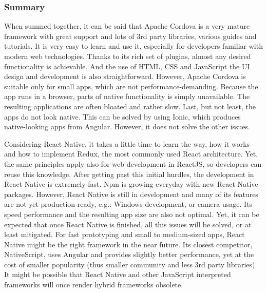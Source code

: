 \documentclass[english,master,public,dept460,male,cpdeclaration,oneside]{diploma}
\begin{document}
\subsubsection{Summary}
When summed together, it can be said that Apache Cordova is a very mature framework with great support and lots of 3rd party libraries, various guides and tutorials. It is very easy to learn and use it, especially for developers familiar with modern web technologies. Thanks to its rich set of plugins, almost any desired functionality is achievable. And the use of HTML, CSS and JavaScript the UI design and development is also straightforward. However, Apache Cordova is suitable only for small apps, which are not performance-demanding. Because the app runs in a browser, parts of native functionality is simply unavailable. The resulting applications are often bloated and rather slow. Last, but not least, the apps do not look native. This can be solved by using Ionic, which produces native-looking apps from Angular. However, it does not solve the other issues. 

Considering React Native, it takes a little time to learn the way, how it works and how to implement Redux, the most commonly used React architecture. Yet, the same principles apply also for web development in ReactJS, so developers can reuse this knowledge. After getting past this initial hurdles, the development in React Native is extremely fast. Npm is growing everyday with new React Native packages. However, React Native is still in development and many of its features are not yet production-ready, e.g.: Windows development, or camera usage. Its speed performance and the resulting app size are also not optimal. Yet, it can be expected that once React Native is finished, all this issues will be solved, or at least mitigated. For fast prototyping and small to medium-sized apps, React Native might be the right framework in the near future. Its closest competitor, NativeScript, uses Angular and provides slightly better performance, yet at the cost of smaller popularity (thus smaller community and less 3rd party libraries). It might be possible that React Native and other JavaScript interpreted frameworks will once render hybrid frameworks obsolete.
\end{document}
